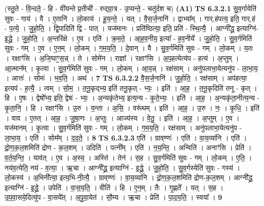 \documentclass[17pt]{extarticle}
\begin{document}
                  \newline
                      (स्तु॒ते - वि॒न्दते॒ - हि - वी॑यन्ते प्र॒तीची॑ - रुद्ग्रा॒त्र - उ॒प्यन्ते॒ - चतु॑र्दश च)  \textbf{(A1)} \newline \newline
                                \textbf{ TS 6.3.2.1} \newline
                  सु॒व॒र्गायेति॑ सुवः - गाय॑ । वै । ए॒तानि॑ । लो॒काय॑ । हू॒य॒न्ते॒ । यत् । वै॒स॒र्ज॒नानि॑ । द्वाभ्या᳚म् । गार्.ह॑पत्य॒ इति॒ गार्.ह॑ - प॒त्ये॒ । जु॒हो॒ति॒ । द्वि॒पादिति॑ द्वि - पात् । यज॑मानः । प्रति॑ष्ठित्या॒ इति॒ प्रति॑ - स्थि॒त्यै॒ । आग्नी᳚द्ध्र॒ इत्याग्नि॑-इ॒द्ध्रे॒ । जु॒हो॒ति॒ । अ॒न्तरि॑क्षे । ए॒व । एति॑ । क्र॒म॒ते॒ । आ॒ह॒व॒नीय॒ इत्या᳚ - ह॒व॒नीये᳚ । जु॒हो॒ति॒ । सु॒व॒र्गमिति॑ सुवः - गम् । ए॒व । ए॒न॒म् । लो॒कम् । ग॒म॒य॒ति॒ । दे॒वान् । वै । सु॒व॒र्गमिति॑ सुवः - गम् । लो॒कम् । य॒तः । रक्षाꣳ॑सि । अ॒जि॒घाꣳ॒॒स॒न्न् । ते । सोमे॑न । राज्ञा᳚ । रक्षाꣳ॑सि । अ॒प॒हत्येत्य॑प - हत्य॑ । अ॒प्तुम् । आ॒त्मान᳚म् । कृ॒त्वा । सु॒व॒र्गमिति॑ सुवः - गम् । लो॒कम् । आ॒य॒न्न् । रक्ष॑साम् । अनु॑पलाभा॒येत्यनु॑प - ला॒भा॒य॒ । आत्तः॑ । सोमः॑ । भ॒व॒ति॒ । अथ॑ । \textbf{  7} \newline
                  \newline
                                \textbf{ TS 6.3.2.2} \newline
                  वै॒स॒र्ज॒नानि॑ । जु॒हो॒ति॒ । रक्ष॑साम् । अप॑हत्या॒ इत्यप॑ - ह॒त्यै॒ । त्वम् । सो॒म॒ । त॒नू॒कृद्भ्य॒ इति॑ तनू॒कृत् - भ्यः॒ । इति॑ । आ॒ह॒ । त॒नू॒कृदिति॑ तनू - कृत् । हि । ए॒षः । द्वेषो᳚भ्य॒ इति॒ द्वेषः॑ - भ्यः॒ । अ॒न्यकृ॑तेभ्य॒ इत्य॒न्य - कृ॒ते॒भ्यः॒ । इति॑ । आ॒ह॒ । अ॒न्यकृ॑ता॒नीत्य॒न्य - कृ॒ता॒नि॒ । हि । रक्षाꣳ॑सि । उ॒रु । य॒न्ता । अ॒सि॒ । वरू॑थम् । इति॑ । आ॒ह॒ । उ॒रु । नः॒ । कृ॒धि॒ । इति॑ । वाव । ए॒तत् । आ॒ह॒ । जु॒षा॒णः । अ॒प्तुः । आज्य॑स्य । वे॒तु॒ । इति॑ । आ॒ह॒ । अ॒प्तुम् । ए॒व । यज॑मानम् । कृ॒त्वा । सु॒व॒र्गमिति॑ सुवः - गम् । लो॒कम् । ग॒म॒य॒ति॒ । रक्ष॑साम् । अनु॑पलाभा॒येत्यनु॑प - ला॒भा॒य॒ । एति॑ । सोम᳚म् । द॒द॒ते॒ । \textbf{  8} \newline
                  \newline
                                \textbf{ TS 6.3.2.3} \newline
                  एति॑ । ग्राव्‌ण्णः॑ । एति॑ । वा॒य॒व्या॑नि । एति॑ । द्रो॒ण॒क॒ल॒शमिति॑ द्रोण - क॒ल॒शम् । उदिति॑ । पत्नी᳚म् । एति॑ । न॒य॒न्ति॒ । अन्विति॑ । अनाꣳ॑सि । प्रेति॑ । व॒र्त॒य॒न्ति॒ । याव॑त् । ए॒व । अ॒स्य॒ । अस्ति॑ । तेन॑ । स॒ह । सु॒व॒र्गमिति॑ सुवः - गम् । लो॒कम् । ए॒ति॒ । नय॑व॒त्येति॒ नय॑ - व॒त्या॒ । ऋ॒चा । आग्नी᳚द्ध्र॒ इत्याग्नि॑ - इ॒द्ध्रे॒ । जु॒हो॒ति॒ । सु॒व॒र्गस्येति॑ सुवः - गस्य॑ । लो॒कस्य॑ । अ॒भिनी᳚त्या॒ इत्य॒भि-नी॒त्यै॒ । ग्राव्‌ण्णः॑ । वा॒य॒व्या॑नि । द्रो॒ण॒क॒ल॒शमिति॑ द्रोण-क॒ल॒शम् । आग्नी᳚द्ध्र॒ इत्याग्नि॑ - इ॒द्ध्रे॒ । उपेति॑ । वा॒स॒य॒ति॒ । वीति॑ । हि । ए॒न॒म् । तैः । गृ॒ह्णते᳚ । यत् । स॒ह । उ॒प॒वा॒सये॒दित्यु॑प - वा॒सये᳚त् । अ॒पु॒वा॒येत॑ । सौ॒म्य । ऋ॒चा । प्रेति॑ । पा॒द॒य॒ति॒ । स्वया᳚ । \textbf{  9} \newline
\end{document}
